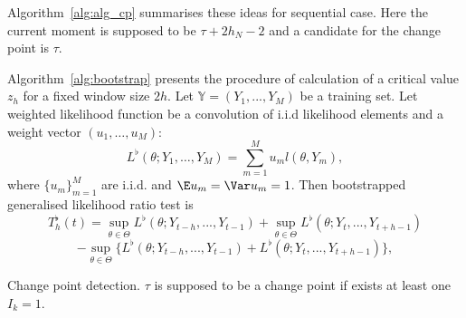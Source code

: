 Algorithm~\ref{alg:alg_cp} summarises these ideas for sequential case. Here the current moment is supposed to be ${\tau + 2h_N - 2}$ and a candidate for the change point is $\tau$.

Algorithm~\ref{alg:bootstrap} presents the procedure of calculation of a critical value $z_h$ for a fixed window size $2h$. Let $\mathbb{Y} = (Y_1,..., Y_M)$ be a training set. Let weighted likelihood function be a convolution of i.i.d likelihood elements and a weight vector $(u_1,\ldots,u_M)$: 
\[
L^{\flat}(\theta; Y_1,\ldots, Y_M) = \sum_{m = 1}^{M} u_m l(\theta, Y_m),
\]
where $\{u_m\}_{m = 1}^M$ are i.i.d. and $\E u_m = \Var u_m = 1$. Then bootstrapped generalised likelihood ratio test is
\[
T_{h}^{\flat}(t) = \sup_{\theta \in \Theta}L^{\flat}(\theta; Y_{t-h},..., Y_{t-1}) + \sup_{\theta \in \Theta}L^{\flat}(\theta; Y_{t},..., Y_{t + h-1})
\]
\[
-\sup_{\theta \in \Theta}\{L^{\flat}(\theta; Y_{t-h},..., Y_{t-1}) + L^{\flat}(\theta; Y_{t},..., Y_{t+h-1})\},
\]

\begin{algorithm}[!th]
\label{alg:alg_cp}


\caption{Change point detection. $\tau$ is supposed to be a change point if exists at least one $I_k = 1$.}
\end{algorithm}


